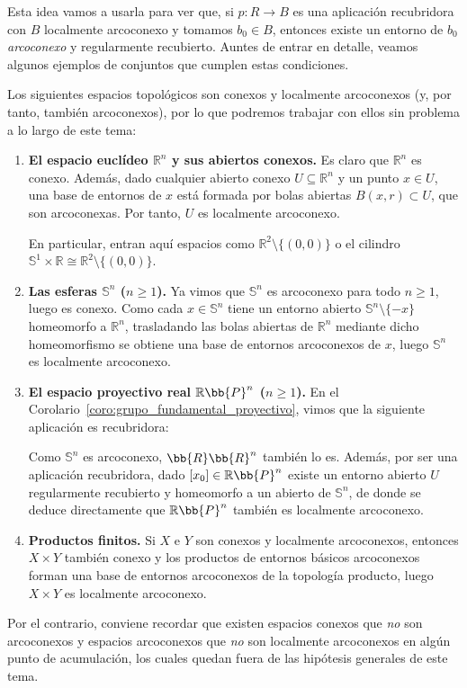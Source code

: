 Esta idea vamos a usarla para ver que, si $p:R\to B$ es una aplicación recubridora con $B$ localmente arcoconexo y tomamos $b_0\in B$, entonces existe un entorno de $b_0$ \emph{arcoconexo} y regularmente recubierto. Auntes de entrar en detalle, veamos algunos ejemplos de conjuntos que cumplen estas condiciones.
\begin{ejemplo}
Los siguientes espacios topológicos son conexos y localmente arcoconexos (y, por tanto, también arcoconexos), por lo que podremos trabajar con ellos sin problema a lo largo de este tema:
\begin{enumerate}
    \item \textbf{El espacio euclídeo $\mathbb{R}^n$ y sus abiertos conexos.} Es claro que $\mathbb{R}^n$ es conexo. Además, dado cualquier abierto conexo $U \subseteq \mathbb{R}^n$ y un punto $x \in U$, una base de entornos de $x$ está formada por bolas abiertas $B(x,r)\subset U$, que son arcoconexas. Por tanto, $U$ es localmente arcoconexo.
    
    En particular, entran aquí espacios como $\mathbb{R}^2 \setminus \{(0,0)\}$ o el cilindro $\mathbb{S}^1 \times \mathbb{R} \cong \mathbb{R}^2 \setminus \{(0,0)\}$.

    \item \textbf{Las esferas $\mathbb{S}^n$ ($n \geq 1$).} Ya vimos que $\mathbb{S}^n$ es arcoconexo para todo $n \geq 1$, luego es conexo. Como cada $x \in \mathbb{S}^n$ tiene un entorno abierto $\mathbb{S}^n \setminus \{-x\}$ homeomorfo a $\mathbb{R}^n$, trasladando las bolas abiertas de $\mathbb{R}^n$ mediante dicho homeomorfismo se obtiene una base de entornos arcoconexos de $x$, luego $\mathbb{S}^n$ es localmente arcoconexo.
    
    \item \textbf{El espacio proyectivo real $\mathbb{R}\bb{P}^n$ ($n \geq 1$).} 
    En el Corolario~\ref{coro:grupo_fundamental_proyectivo}, vimos que la siguiente aplicación es recubridora:

    Como $\mathbb{S}^n$ es arcoconexo, $\bb{R}\bb{R}^n$ también lo es. Además, por ser una aplicación recubridora, dado $[x_0] \in \mathbb{R}\bb{P}^n$ existe un entorno abierto $U$ regularmente recubierto y homeomorfo a un abierto de $\mathbb{S}^n$, de donde se deduce directamente que $\mathbb{R}\bb{P}^n$ también es localmente arcoconexo.

    \item \textbf{Productos finitos.} Si $X$ e $Y$ son conexos y localmente arcoconexos, entonces $X \times Y$ también conexo y los productos de entornos básicos arcoconexos forman una base de entornos arcoconexos de la topología producto, luego $X \times Y$ es localmente arcoconexo.
\end{enumerate}

Por el contrario, conviene recordar que existen espacios conexos que \emph{no} son arcoconexos y espacios arcoconexos que \emph{no} son localmente arcoconexos en algún punto de acumulación, los cuales quedan fuera de las hipótesis generales de este tema.
\end{ejemplo}

